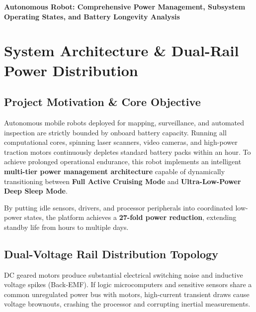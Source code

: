 \documentclass[11pt,a4paper]{article}
\begin{document}
\vspace*{\fill}
\begin{center}
    {\LARGE \textbf{Autonomous Robot: Comprehensive Power Management, Subsystem Operating States, and Battery Longevity Analysis}\par}
\end{center}
\vspace*{\fill}
\thispagestyle{empty}
\newpage

\section{System Architecture \& Dual-Rail Power Distribution}

\subsection{Project Motivation \& Core Objective}
Autonomous mobile robots deployed for mapping, surveillance, and automated inspection are strictly bounded by onboard battery capacity. Running all computational cores, spinning laser scanners, video cameras, and high-power traction motors continuously depletes standard battery packs within an hour. To achieve prolonged operational endurance, this robot implements an intelligent \textbf{multi-tier power management architecture} capable of dynamically transitioning between \textbf{Full Active Cruising Mode} and \textbf{Ultra-Low-Power Deep Sleep Mode}.

By putting idle sensors, drivers, and processor peripherals into coordinated low-power states, the platform achieves a \textbf{27-fold power reduction}, extending standby life from hours to multiple days.

\subsection{Dual-Voltage Rail Distribution Topology}
DC geared motors produce substantial electrical switching noise and inductive voltage spikes (Back-EMF). If logic microcomputers and sensitive sensors share a common unregulated power bus with motors, high-current transient draws cause voltage brownouts, crashing the processor and corrupting inertial measurements.
\end{document}
